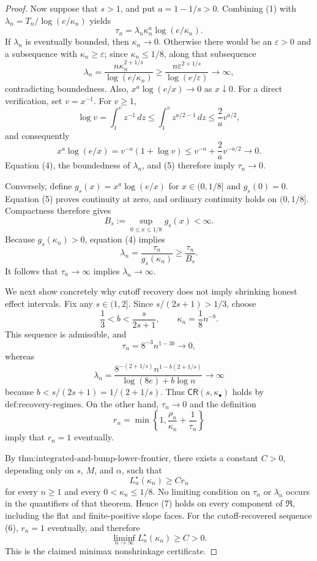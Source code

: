 \documentclass{article}
\begin{document}
\begin{proof}
Now suppose that \(s>1\), and put \(a=1-1/s>0\).  Combining (1) with \(\lambda_n=T_n/\log(e/\kappa_n)\) yields
\[
 \tau_n
 =\lambda_n\kappa_n^a\log(e/\kappa_n).
 \tag{4}
\]
If \(\lambda_n\) is eventually bounded, then \(\kappa_n\to0\).  Otherwise there would be an \(\varepsilon>0\) and a subsequence with \(\kappa_n\ge\varepsilon\); since \(\kappa_n\le1/8\), along that subsequence
\[
 \lambda_n
 =\frac{n\kappa_n^{2+1/s}}{\log(e/\kappa_n)}
 \ge
 \frac{n\varepsilon^{2+1/s}}{\log(e/\varepsilon)}
 \longrightarrow\infty,
\]
contradicting boundedness.  Also, \(x^a\log(e/x)\to0\) as \(x\downarrow0\).  For a direct verification, set \(v=x^{-1}\).  For \(v\ge1\),
\[
 \log v=\int_1^v z^{-1}\,dz
 \le\int_1^v z^{a/2-1}\,dz
 \le\frac{2}{a}v^{a/2},
\]
and consequently
\[
 x^a\log(e/x)
 =v^{-a}(1+\log v)
 \le v^{-a}+\frac{2}{a}v^{-a/2}\longrightarrow0.
 \tag{5}
\]
Equation (4), the boundedness of \(\lambda_n\), and (5) therefore imply \(\tau_n\to0\).

Conversely, define \(g_s(x)=x^a\log(e/x)\) for \(x\in(0,1/8]\) and \(g_s(0)=0\).  Equation (5) proves continuity at zero, and ordinary continuity holds on \((0,1/8]\).  Compactness therefore gives
\[
 B_s:=\sup_{0\le x\le1/8}g_s(x)<\infty.
\]
Because \(g_s(\kappa_n)>0\), equation (4) implies
\[
 \lambda_n=\frac{\tau_n}{g_s(\kappa_n)}
 \ge\frac{\tau_n}{B_s}.
\]
It follows that \(\tau_n\to\infty\) implies \(\lambda_n\to\infty\).

We next show concretely why cutoff recovery does not imply shrinking honest effect intervals.  Fix any \(s\in(1,2]\).  Since \(s/(2s+1)>1/3\), choose
\[
 \frac13<b<\frac{s}{2s+1},
 \qquad
 \kappa_n=\frac18 n^{-b}.
 \tag{6}
\]
This sequence is admissible, and
\[
 \tau_n=8^{-3}n^{1-3b}\longrightarrow0,
\]
whereas
\[
 \lambda_n
 =\frac{8^{-(2+1/s)}n^{1-b(2+1/s)}}{\log(8e)+b\log n}
 \longrightarrow\infty
\]
because \(b<s/(2s+1)=1/(2+1/s)\).  Thus \(\mathsf{CR}(s,\kappa_\bullet)\) holds by \(\text{def:recovery-regimes}\).  On the other hand, \(\tau_n\to0\) and the definition
\[
 r_n=\min\left\{1,\frac{\rho_n}{\kappa_n}+\frac{1}{\tau_n}\right\}
\]
imply that \(r_n=1\) eventually.

By \(\text{thm:integrated-and-bump-lower-frontier}\), there exists a constant \(C>0\), depending only on \(s\), \(M\), and \(\alpha\), such that
\[
 L_n^\star(\kappa_n)\ge C r_n
 \tag{7}
\]
for every \(n\ge1\) and every \(0<\kappa_n\le1/8\).  No limiting condition on \(\tau_n\) or \(\lambda_n\) occurs in the quantifiers of that theorem.  Hence (7) holds on every component of \(\mathfrak R\), including the flat and finite-positive slope faces.  For the cutoff-recovered sequence (6), \(r_n=1\) eventually, and therefore
\[
 \liminf_{n\to\infty}L_n^\star(\kappa_n)\ge C>0.
\]
This is the claimed minimax nonshrinkage certificate.


\end{proof}
\end{document}
